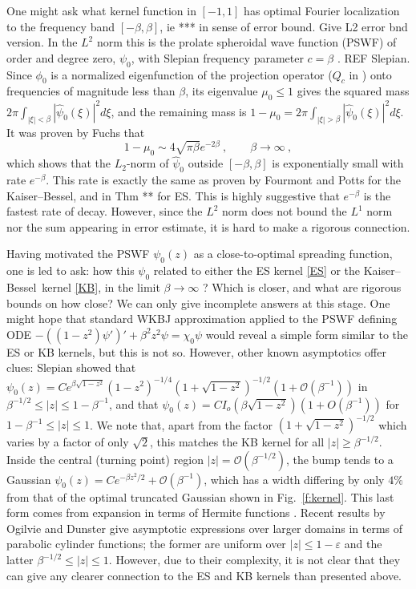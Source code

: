 \documentclass[10pt]{article}
\newcommand{\be}{\begin{equation}}
\newcommand{\ee}{\end{equation}}
\newcommand{\eps}{\varepsilon}
\newcommand{\bigO}{{\mathcal O}}
\newcommand{\freq}{\beta}          %
\newcommand{\KB}{Kaiser--Bessel}
\begin{document}
One might ask what kernel function in $[-1,1]$ has optimal Fourier localization
to the frequency band $[-\freq,\freq]$,
ie *** in sense of error bound.
Give L2 error bnd version.
In the $L^2$ norm this is the prolate spheroidal wave function (PSWF)
of order and degree zero, $\psi_0$,
with Slepian frequency parameter $c=\freq$
\cite{osipov}. REF Slepian.
Since $\phi_0$ is a normalized eigenfunction of the projection operator
($Q_c$ in \cite{osipov}) onto frequencies
of magnitude less than $\freq$,
its eigenvalue $\mu_0\le 1$ gives the
squared mass
$2\pi \int_{|\xi|<\freq}|\hat\psi_0(\xi)|^2 d\xi$,
and the remaining mass is
$1-\mu_0 =2\pi \int_{|\xi|>\freq}|\hat\psi_0(\xi)|^2 d\xi$.
It was proven by Fuchs \cite{fuchs} that
\be
1 - \mu_0 \sim 4\sqrt{\pi\freq} e^{-2\freq} ~, \qquad \freq\to\infty~,
\label{fuchs}
\ee
which shows that the $L_2$-norm of $\hat\psi_0$ outside
$[-\freq,\freq]$ is exponentially small with rate $e^{-\freq}$.
This rate is exactly the same as
proven by Fourmont and Potts for the \KB, and in Thm ** for ES.
This is highly suggestive that $e^{-\freq}$ is the fastest
rate of decay.
However, since the $L^2$ norm does not bound the $L^1$ norm
nor the sum appearing in error estimate,
it is hard to make a rigorous connection.

Having motivated the PSWF $\psi_0(z)$ as a close-to-optimal
spreading function, one is led to ask:
how this $\psi_0$ related to either the
ES kernel \eqref{ES} or the \KB\ kernel \eqref{KB},
in the limit $\freq\to\infty$ ?
Which is closer, and what are rigorous bounds on how close?
We can only give incomplete answers at this stage.
One might hope that
standard WKBJ approximation applied to the PSWF defining
ODE $-((1-z^2)\psi')'+\freq^2z^2\psi = \chi_0\psi$
would reveal a simple form similar to the ES or KB kernels,
but this is not so.
However, other known asymptotics offer clues:
Slepian \cite[(1.4)]{slepian65}
showed that $\psi_0(z) = C e^{\freq\sqrt{1-z^2}} (1-z^2)^{-1/4}
(1+\sqrt{1-z^2})^{-1/2}(1 + \bigO(\freq^{-1}))$
in $\freq^{-1/2} \le |z| \le 1-\freq^{-1}$,
and
that $\psi_0(z) = C I_o(\freq \sqrt{1-z^2}) (1 + O(\freq^{-1}))$
for $1-\freq^{-1} \le |z| \le 1$.
We note that, apart from the factor $(1+\sqrt{1-z^2})^{-1/2}$
which varies by a factor of only $\sqrt{2}$,
this matches the KB kernel for all $|z|\ge \freq^{-1/2}$.
Inside the central (turning point) region
$|z| = \bigO(\freq^{-1/2})$,
the bump tends to a Gaussian
$\psi_0(z) = C e^{-\beta z^2 /2} + \bigO(\freq^{-1})$,
which has a width differing by only $4\%$ from that of the
optimal truncated Gaussian shown in Fig.~\ref{f:kernel}.
This last form comes from expansion in terms of Hermite functions
\cite[\S 3.25]{meixner} %
\cite[Sec.~8.6]{osipov}.
Recent results by Ogilvie \cite[Sec.~4.4]{ogilvie}
and Dunster \cite{dunster}
give asymptotic expressions over larger domains
in terms of parabolic cylinder functions;
the former are uniform over $|z|\le 1-\eps$ and the
latter $\freq^{-1/2}\le|z|\le1$.
However, due to their complexity,
it is not clear that they can give
any clearer connection to the ES and KB kernels than presented above.
\end{document}
